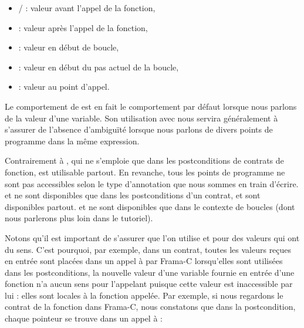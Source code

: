 \begin{itemize}
\item {}/ : valeur avant l'appel de la fonction,
\item {} : valeur après l'appel de la fonction,
\item {} : valeur en début de boucle,
\item {} : valeur en début du pas actuel de la boucle,
\item {} : valeur au point d'appel.
\end{itemize}


\begin{Information}
Le comportement de  est en fait le comportement par défaut lorsque
nous parlons de la valeur d'une variable. Son utilisation avec  nous
servira généralement à s'assurer de l'absence d’ambiguïté lorsque nous parlons
de divers points de programme dans la même expression.
\end{Information}


Contrairement à , qui ne s'emploie que dans les
postconditions de contrats de fonction,  est utilisable partout.
En revanche, tous les points de programme ne sont pas accessibles selon le type
d'annotation que nous sommes en train d'écrire.  et  ne sont
disponibles que dans les postconditions d'un contrat,  et 
sont disponibles partout.  et  ne sont
disponibles que dans le contexte de boucles (dont nous parlerons plus loin dans
le tutoriel).


Notons qu'il est important de s'assurer que l'on utilise  et
 pour des valeurs qui ont du sens. C'est pourquoi, par
exemple, dans un contrat, toutes les valeurs reçues en entrée sont placées dans un
appel à  par Frama-C lorsqu'elles sont utilisées dans
les postconditions, la nouvelle valeur d'une variable fournie en entrée d'une
fonction n'a aucun sens pour l'appelant puisque cette valeur est inaccessible par
lui : elles sont locales à la fonction appelée. Par exemple, si nous regardons le
contrat de la fonction  dans Frama-C, nous constatons que dans
la postcondition, chaque pointeur se trouve dans un appel à  :


